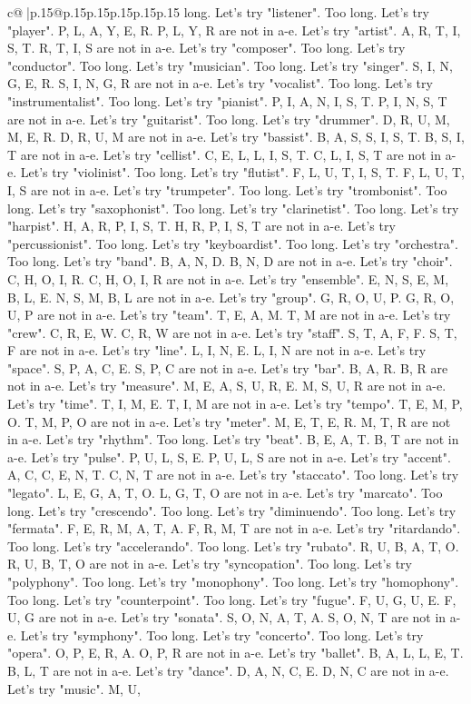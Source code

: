 \documentclass{article}
\begin{document}
{\begin{supertabular}{c@{$\;$}|p{.15\linewidth}@{}p{.15\linewidth}p{.15\linewidth}p{.15\linewidth}p{.15\linewidth}p{.15\linewidth}}
{{{long. Let's try "listener". Too long. Let's try "player". P, L, A, Y, E, R. P, L, Y, R are not in a{-}e. Let's try "artist". A, R, T, I, S, T. R, T, I, S are not in a{-}e. Let's try "composer". Too long. Let's try "conductor". Too long. Let's try "musician". Too long. Let's try "singer". S, I, N, G, E, R. S, I, N, G, R are not in a{-}e. Let's try "vocalist". Too long. Let's try "instrumentalist". Too long. Let's try "pianist". P, I, A, N, I, S, T. P, I, N, S, T are not in a{-}e. Let's try "guitarist". Too long. Let's try "drummer". D, R, U, M, M, E, R. D, R, U, M are not in a{-}e. Let's try "bassist". B, A, S, S, I, S, T. B, S, I, T are not in a{-}e. Let's try "cellist". C, E, L, L, I, S, T. C, L, I, S, T are not in a{-}e. Let's try "violinist". Too long. Let's try "flutist". F, L, U, T, I, S, T. F, L, U, T, I, S are not in a{-}e. Let's try "trumpeter". Too long. Let's try "trombonist". Too long. Let's try "saxophonist". Too long. Let's try "clarinetist". Too long. Let's try "harpist". H, A, R, P, I, S, T. H, R, P, I, S, T are not in a{-}e. Let's try "percussionist". Too long. Let's try "keyboardist". Too long. Let's try "orchestra". Too long. Let's try "band". B, A, N, D. B, N, D are not in a{-}e. Let's try "choir". C, H, O, I, R. C, H, O, I, R are not in a{-}e. Let's try "ensemble". E, N, S, E, M, B, L, E. N, S, M, B, L are not in a{-}e. Let's try "group". G, R, O, U, P. G, R, O, U, P are not in a{-}e. Let's try "team". T, E, A, M. T, M are not in a{-}e. Let's try "crew". C, R, E, W. C, R, W are not in a{-}e. Let's try "staff". S, T, A, F, F. S, T, F are not in a{-}e. Let's try "line". L, I, N, E. L, I, N are not in a{-}e. Let's try "space". S, P, A, C, E. S, P, C are not in a{-}e. Let's try "bar". B, A, R. B, R are not in a{-}e. Let's try "measure". M, E, A, S, U, R, E. M, S, U, R are not in a{-}e. Let's try "time". T, I, M, E. T, I, M are not in a{-}e. Let's try "tempo". T, E, M, P, O. T, M, P, O are not in a{-}e. Let's try "meter". M, E, T, E, R. M, T, R are not in a{-}e. Let's try "rhythm". Too long. Let's try "beat". B, E, A, T. B, T are not in a{-}e. Let's try "pulse". P, U, L, S, E. P, U, L, S are not in a{-}e. Let's try "accent". A, C, C, E, N, T. C, N, T are not in a{-}e. Let's try "staccato". Too long. Let's try "legato". L, E, G, A, T, O. L, G, T, O are not in a{-}e. Let's try "marcato". Too long. Let's try "crescendo". Too long. Let's try "diminuendo". Too long. Let's try "fermata". F, E, R, M, A, T, A. F, R, M, T are not in a{-}e. Let's try "ritardando". Too long. Let's try "accelerando". Too long. Let's try "rubato". R, U, B, A, T, O. R, U, B, T, O are not in a{-}e. Let's try "syncopation". Too long. Let's try "polyphony". Too long. Let's try "monophony". Too long. Let's try "homophony". Too long. Let's try "counterpoint". Too long. Let's try "fugue". F, U, G, U, E. F, U, G are not in a{-}e. Let's try "sonata". S, O, N, A, T, A. S, O, N, T are not in a{-}e. Let's try "symphony". Too long. Let's try "concerto". Too long. Let's try "opera". O, P, E, R, A. O, P, R are not in a{-}e. Let's try "ballet". B, A, L, L, E, T. B, L, T are not in a{-}e. Let's try "dance". D, A, N, C, E. D, N, C are not in a{-}e. Let's try "music". M, U, }}}
\end{supertabular}}
\end{document}
